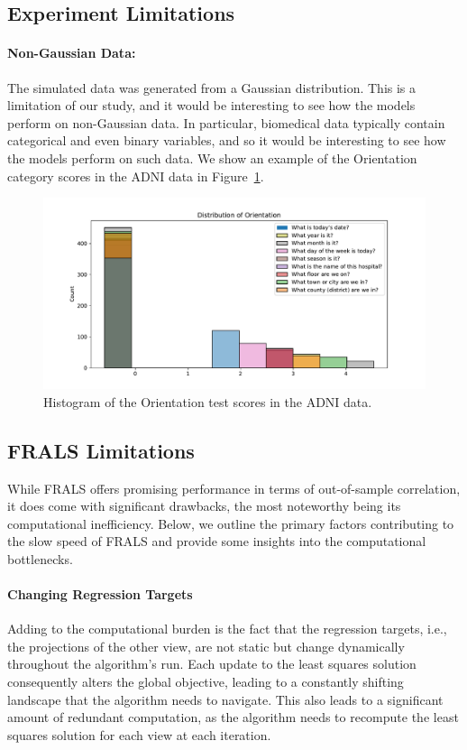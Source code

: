 \subsection{Experiment Limitations}

\paragraph{Non-Gaussian Data:} The simulated data was generated from a Gaussian distribution.
This is a limitation of our study, and it would be interesting to see how the models perform on non-Gaussian data.
In particular, biomedical data typically contain categorical and even binary variables, and so it would be interesting to see how the models perform on such data.
We show an example of the Orientation category scores in the ADNI data in Figure~\ref{fig:adni-behavioural-data}.

\begin{figure}
\centering
\includegraphics[width=\linewidth]{figures/regularization/adni/Orientation}
\caption{Histogram of the Orientation test scores in the ADNI data.}\label{fig:adni-behavioural-data}
\end{figure}

\subsection{FRALS Limitations}
While FRALS offers promising performance in terms of out-of-sample correlation, it does come with significant drawbacks, the most noteworthy being its computational inefficiency.
Below, we outline the primary factors contributing to the slow speed of FRALS and provide some insights into the computational bottlenecks.

\paragraph{Changing Regression Targets}\label{subsec:changing-regression-targets}
Adding to the computational burden is the fact that the regression targets, i.e., the projections of the other view, are not static but change dynamically throughout the algorithm's run.
Each update to the least squares solution consequently alters the global objective, leading to a constantly shifting landscape that the algorithm needs to navigate.
This also leads to a significant amount of redundant computation, as the algorithm needs to recompute the least squares solution for each view at each iteration.

